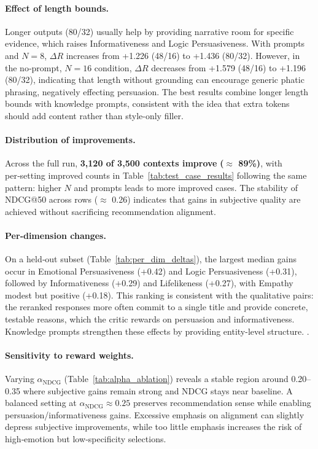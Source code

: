 \documentclass[12pt]{article}
\begin{document}
  \paragraph{Effect of length bounds.} Longer outputs (80/32) usually help by providing narrative room for specific evidence, which raises Informativeness and Logic Persuasiveness. With prompts and $N=8$, \(\Delta R\) increases from +1.226 (48/16) to +1.436 (80/32). However, in the no‑prompt, $N=16$ condition, \(\Delta R\) decreases from +1.579 (48/16) to +1.196 (80/32), indicating that length without grounding can encourage generic phatic phrasing, negatively effecting persuasion. The best results combine longer length bounds with knowledge prompts, consistent with the idea that extra tokens should add content rather than style-only filler.

  \paragraph{Distribution of improvements.} Across the full run, \textbf{3{,}120 of 3{,}500 contexts improve} \textbf{(\(\approx\) 89\%)}, with per‑setting improved counts in Table~\ref{tab:test_case_results} following the same pattern: higher $N$ and prompts leads to more improved cases. The stability of NDCG@50 across rows (\(\approx\) 0.26) indicates that gains in subjective quality are achieved without sacrificing recommendation alignment.

  \paragraph{Per‑dimension changes.} On a held‑out subset (Table~\ref{tab:per_dim_deltas}), the largest median gains occur in Emotional Persuasiveness (+0.42) and Logic Persuasiveness (+0.31), followed by Informativeness (+0.29) and Lifelikeness (+0.27), with Empathy modest but positive (+0.18). This ranking is consistent with the qualitative pairs: the reranked responses more often commit to a single title and provide concrete, testable reasons, which the critic rewards on persuasion and informativeness. Knowledge prompts strengthen these effects by providing entity-level structure. \citep{chen2020kbrd,zhou2020kgsf,lewis2020rag}.

  \paragraph{Sensitivity to reward weights.} Varying \(\alpha_{\mathrm{NDCG}}\) (Table~\ref{tab:alpha_ablation}) reveals a stable region around 0.20–0.35 where subjective gains remain strong and NDCG stays near baseline. A balanced setting at \(\alpha_{\mathrm{NDCG}}\approx 0.25\) preserves recommendation sense while enabling persuasion/informativeness gains. Excessive emphasis on alignment can slightly depress subjective improvements, while too little emphasis increases the risk of high‑emotion but low‑specificity selections.
\end{document}
